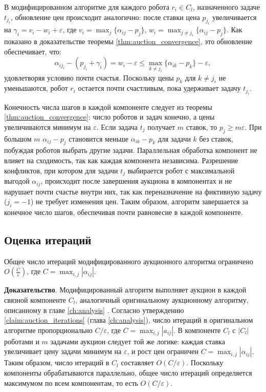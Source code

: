 В модифицированном алгоритме для каждого робота \( r_i \in C_l \), назначенного задаче \( t_{j_i} \), обновление цен происходит аналогично: после ставки цена \( p_{j_i} \) увеличивается на \( \gamma_i = v_i - w_i + \varepsilon \), где \( v_i = \max_j \{\alpha_{ij} - p_j\} \), \( w_i = \max_{j \neq j_i} \{\alpha_{ij} - p_j\} \). Как показано в доказательстве теоремы \ref{thm:auction_convergence}, это обновление обеспечивает, что:
\[
\alpha_{i j_i} - (p_{j_i} + \gamma_i) = w_i - \varepsilon \leq \max_{k \neq j_i} \{\alpha_{i k} - p_k\} - \varepsilon,
\]
удовлетворяя условию почти счастья. Поскольку цены \( p_k \) для \( k \neq j_i \) не уменьшаются, робот \( r_i \) остается почти счастливым, пока удерживает задачу \( t_{j_i} \).

Конечность числа шагов в каждой компоненте следует из теоремы \ref{thm:auction_convergence}: число роботов и задач конечно, а цены увеличиваются минимум на \( \varepsilon \). Если задача \( t_j \) получает \( m \) ставок, то \( p_j \geq m \varepsilon \). При большом \( m \) \( \alpha_{i j} - p_j \) становится меньше \( \alpha_{i k} - p_k \) для задачи \( k \) без ставок, побуждая роботов выбрать другие задачи. Параллельная обработка компонент не влияет на сходимость, так как каждая компонента независима. Разрешение конфликтов, при котором для задачи \( t_j \) выбирается робот с максимальной выгодой \( \alpha_{ij} \), происходит после завершения аукциона в компонентах и не нарушает почти счастье внутри них, так как переназначение на фиктивную задачу (\( j_i = -1 \)) не требует изменения цен. Таким образом, алгоритм завершается за конечное число шагов, обеспечивая почти равновесие в каждой компоненте.

\subsection{Оценка итераций}

\begin{claim}
\label{claim:mod_auction_iterations}
Общее число итераций модифицированного аукционного алгоритма ограничено \( O\left( \frac{C}{\varepsilon} \right) \), где \( C = \max_{i,j} |\alpha_{ij}| \).
\end{claim}

\textbf{Доказательство}. 
Модифицированный алгоритм выполняет аукцион в каждой связной компоненте \( C_l \), аналогичный оригинальному аукционному алгоритму, описанному в главе \ref{ch:analysis} \cite{bertsekas1990}. Согласно утверждению \ref{claim:auction_iterations} (глава \ref{ch:analysis}), число итераций в оригинальном алгоритме пропорционально \( C / \varepsilon \), где \( C = \max_{i,j} |a_{ij}| \). В компоненте \( C_l \) с \( |C_l| \) роботами и \( m \) задачами аукцион следует той же логике: каждая ставка увеличивает цену задачи минимум на \( \varepsilon \), и рост цен ограничен \( C = \max_{i,j} |\alpha_{ij}| \). Таким образом, число итераций в \( C_l \) составляет \( O(C / \varepsilon) \). Поскольку компоненты обрабатываются параллельно, общее число итераций определяется максимумом по всем компонентам, то есть \( O(C / \varepsilon) \).

